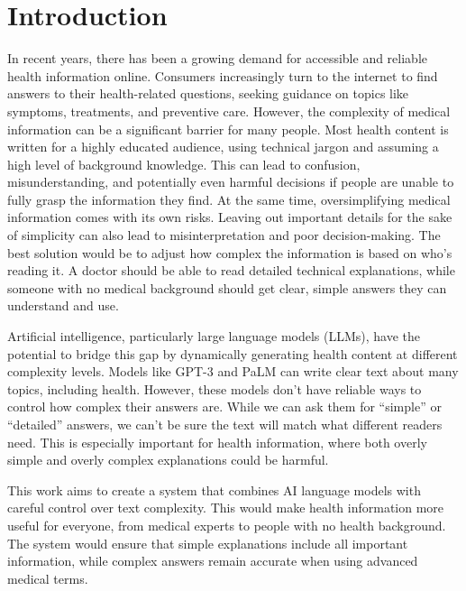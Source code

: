 \chapter{Introduction}
\label{c1}

In recent years, there has been a growing demand for accessible and reliable health information online.
Consumers increasingly turn to the internet to find answers to their health-related questions, seeking guidance on topics like symptoms, treatments, and preventive care.
However, the complexity of medical information can be a significant barrier for many people.
Most health content is written for a highly educated audience, using technical jargon and assuming a high level of background knowledge. %
This can lead to confusion, misunderstanding, and potentially even harmful decisions if people are unable to fully grasp the information they find. %
At the same time, oversimplifying medical information comes with its own risks.
Leaving out important details for the sake of simplicity can also lead to misinterpretation and poor decision-making. %
The best solution would be to adjust how complex the information is based on who's reading it. A doctor should be able to read detailed technical explanations, while someone with no medical background should get clear, simple answers they can understand and use.

Artificial intelligence, particularly large language models (LLMs), have the potential to bridge this gap by dynamically generating health content at different complexity levels.
Models like GPT-3  \cite{brown2020languagemodelsfewshotlearners} and PaLM \cite{chowdhery2022palmscalinglanguagemodeling} can write clear text about many topics, including health.
However, these models don't have reliable ways to control how complex their answers are.
While we can ask them for ``simple'' or ``detailed'' answers, we can't be sure the text will match what different readers need. 
This is especially important for health information, where both overly simple and overly complex explanations could be harmful.

This work aims to create a system that combines AI language models with careful control over text complexity. This would make health information more useful for everyone, from medical experts to people with no health background. The system would ensure that simple explanations include all important information, while complex answers remain accurate when using advanced medical terms.

